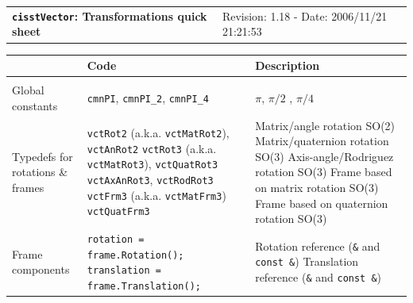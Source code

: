 \documentclass[letterpaper,10pt]{article}
\newcommand{\docdate}{$ $Date: 2006/11/21 21:21:53 $ $}
\newcommand{\docrev}{$ $Revision: 1.18 $ $}
\newcommand{\doublehlinethree}{\hline & & \\ [-10pt] \hline}
\begin{document}
  \begin{center}

    \begin{tabular}{p{5.5in}p{1.5in}}
      \large \bf
      \texttt{cisstVector}: Transformations quick sheet & {\tiny \textsf{\docrev - \docdate}}
    \end{tabular}

    \begin{tabular}{|p{1.2in}|p{3.2in}|p{2.4in}|}
      
      \hline
          &
          {\bf Code} &
          {\bf Description} \\
          \doublehlinethree

          Global constants
          &
          \texttt{cmnPI}, \texttt{cmnPI\_2}, \texttt{cmnPI\_4}
          &
          $\pi$, $\pi / 2$ , $\pi / 4$
          \\
          \hline

          Typedefs for \newline
          rotations \& \newline
          frames
          &
          \texttt{vctRot2} (a.k.a. \texttt{vctMatRot2}), \texttt{vctAnRot2} \newline
          \texttt{vctRot3} (a.k.a. \texttt{vctMatRot3}), \texttt{vctQuatRot3} \newline
          \texttt{vctAxAnRot3}, \texttt{vctRodRot3} \newline
          \texttt{vctFrm3} (a.k.a. \texttt{vctMatFrm3}) \newline
          \texttt{vctQuatFrm3}
          &
          Matrix/angle rotation SO(2) \newline
          Matrix/quaternion rotation SO(3) \newline
          Axis-angle/Rodriguez rotation SO(3) \newline
          Frame based on matrix rotation SO(3) \newline
          Frame based on quaternion rotation SO(3)
          \\
          \hline

          Frame components
          &
          \texttt{rotation = frame.Rotation();} \newline
          \texttt{translation = frame.Translation();}
          &
          Rotation reference (\texttt{\&} and \texttt{const \&}) \newline
          Translation reference (\texttt{\&} and \texttt{const \&})
          \\
          \hline


\end{tabular}
\end{center}
\end{document}
